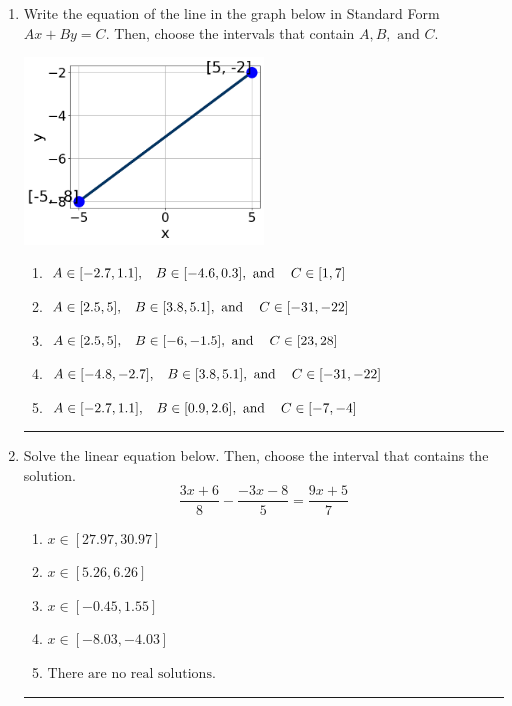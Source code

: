 \documentclass[14pt]{extbook}
\newcommand{\litem}[1]{\item#1\hspace*{-1cm}\rule{\textwidth}{0.4pt}}
\begin{document}
\begin{enumerate}
{\begin{enumerate}[label=\Alph*.]
\end{enumerate} }
\litem{
Write the equation of the line in the graph below in Standard Form $Ax+By=C$. Then, choose the intervals that contain $A, B, \text{ and } C$.
\begin{center}
    \includegraphics[width=0.5\textwidth]{../Figures/linearGraphToStandardA.png}
\end{center}
\begin{enumerate}[label=\Alph*.]
\item \( A \in [-2.7, 1.1], \hspace{3mm} B \in [-4.6, 0.3], \text{ and } \hspace{3mm} C \in [1, 7] \)
\item \( A \in [2.5, 5], \hspace{3mm} B \in [3.8, 5.1], \text{ and } \hspace{3mm} C \in [-31, -22] \)
\item \( A \in [2.5, 5], \hspace{3mm} B \in [-6, -1.5], \text{ and } \hspace{3mm} C \in [23, 28] \)
\item \( A \in [-4.8, -2.7], \hspace{3mm} B \in [3.8, 5.1], \text{ and } \hspace{3mm} C \in [-31, -22] \)
\item \( A \in [-2.7, 1.1], \hspace{3mm} B \in [0.9, 2.6], \text{ and } \hspace{3mm} C \in [-7, -4] \)

\end{enumerate} }
\litem{
Solve the linear equation below. Then, choose the interval that contains the solution.\[ \frac{3x + 6}{8} - \frac{-3x -8}{5} = \frac{9x + 5}{7} \]\begin{enumerate}[label=\Alph*.]
\item \( x \in [27.97, 30.97] \)
\item \( x \in [5.26, 6.26] \)
\item \( x \in [-0.45, 1.55] \)
\item \( x \in [-8.03, -4.03] \)
\item \( \text{There are no real solutions.} \)


\end{enumerate}}
\end{enumerate}
\end{document}
